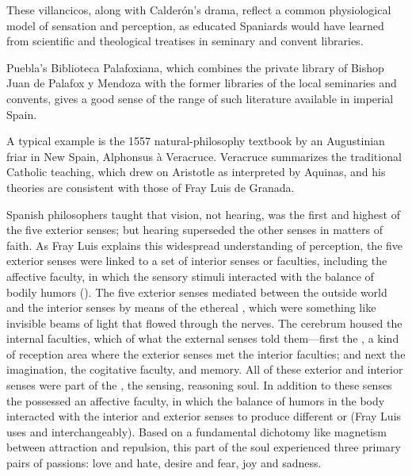 These villancicos, along with Calderón's drama, reflect a common physiological
model of sensation and perception, as educated Spaniards would have learned
from scientific and theological treatises in seminary and convent libraries.%
\begin{Footnote}
    Puebla's Biblioteca Palafoxiana, which combines the private library of Bishop
    Juan de Palafox y Mendoza with the former libraries of the local seminaries
    and convents, gives a good sense of the range of such literature available
    in imperial Spain.
\end{Footnote}
A typical example is the 1557 natural-philosophy textbook  by an Augustinian friar in New Spain, Alphonsus à Veracruce.%
    \Autocite{Veracruce:Phisica}
Veracruce summarizes the traditional Catholic teaching, which drew on Aristotle
as interpreted by Aquinas, and his theories are consistent with those of Fray
Luis de Granada.


Spanish philosophers taught that vision, not hearing, was the first and highest
of the five exterior senses; but hearing superseded the other senses in matters
of faith.
As Fray Luis explains this widespread understanding of perception, the five
exterior senses were linked to a set of interior senses or faculties, including
the affective faculty, in which the sensory stimuli interacted with the balance
of bodily humors ().%
    \Autocite
    [, ]
    {LuisdeGranada-Balcells:SimboloPtI}
The five exterior senses mediated between the outside world and the interior
senses by means of the ethereal , which were something
like invisible beams of light that flowed through the nerves.  
The cerebrum housed the internal faculties, which  of what
the external senses told them---first the , a kind of
reception area where the exterior senses met the interior faculties; and next
the imagination, the cogitative faculty, and memory.
All of these exterior and interior senses were part of the , the sensing, reasoning soul.
In addition to these senses the  possessed an affective
faculty, in which the balance of humors in the body interacted with the interior
and exterior senses to produce different  or 
(Fray Luis uses  and  interchangeably).
Based on a fundamental dichotomy like magnetism between attraction and
repulsion, this  part of the soul experienced three
primary pairs of passions: love and hate, desire and fear, joy and sadness.

